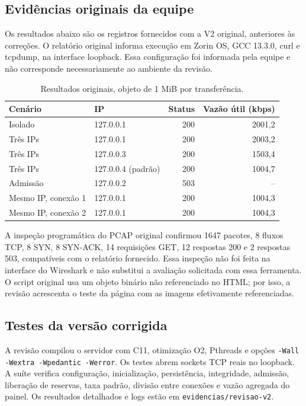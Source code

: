 \documentclass[12pt]{article}
\begin{document}
\subsection{Evidências originais da equipe}
Os resultados abaixo são os registros fornecidos com a V2 original, anteriores
às correções. O relatório original informa execução em Zorin OS, GCC 13.3.0,
curl e tcpdump, na interface loopback. Essa configuração foi informada pela
equipe e não corresponde necessariamente ao ambiente da revisão.

\begin{table}[ht]
\centering\small
\caption{Resultados originais, objeto de 1 MiB por transferência.}
\begin{tabular}{llrr}
\toprule
Cenário & IP & Status & Vazão útil (kbps)\\
\midrule
Isolado & 127.0.0.1 & 200 & 2001,2\\
Três IPs & 127.0.0.1 & 200 & 2003,2\\
Três IPs & 127.0.0.3 & 200 & 1503,4\\
Três IPs & 127.0.0.4 (padrão) & 200 & 1004,7\\
Admissão & 127.0.0.2 & 503 & --\\
Mesmo IP, conexão 1 & 127.0.0.1 & 200 & 1004,3\\
Mesmo IP, conexão 2 & 127.0.0.1 & 200 & 1004,3\\
\bottomrule
\end{tabular}
\end{table}

A inspeção programática do PCAP original confirmou 1647 pacotes, 8 fluxos TCP,
8 SYN, 8 SYN-ACK, 14 requisições GET, 12 respostas 200 e 2 respostas 503,
compatíveis com o relatório fornecido. Essa inspeção não foi feita na interface
do Wireshark e não substitui a avaliação solicitada com essa ferramenta.
O script original usa um objeto binário não referenciado no HTML; por isso,
a revisão acrescenta o teste da página com as imagens efetivamente referenciadas.

\subsection{Testes da versão corrigida}
A revisão compilou o servidor com C11, otimização O2, Pthreads e opções
\texttt{-Wall -Wextra -Wpedantic -Werror}. Os testes abrem sockets TCP reais
no loopback. A suíte verifica configuração, inicialização, persistência,
integridade, admissão, liberação de reservas, taxa padrão, divisão entre
conexões e vazão agregada do painel. Os resultados detalhados e logs estão em
\texttt{evidencias/revisao-v2}.
\end{document}
